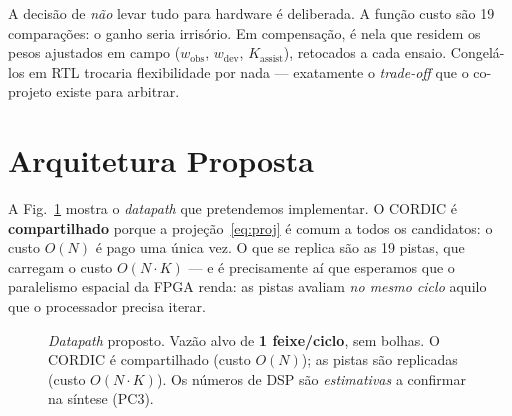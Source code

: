 \documentclass[conference]{IEEEtran}
\begin{document}
A decis\~ao de \emph{n\~ao} levar tudo para hardware \'e deliberada. A fun\c{c}\~ao
custo s\~ao \num{19} compara\c{c}\~oes: o ganho seria irris\'orio. Em compensa\c{c}\~ao,
\'e nela que residem os pesos ajustados em campo ($w_{\text{obs}}$,
$w_{\text{dev}}$, $K_{\text{assist}}$), retocados a cada ensaio. Congel\'a-los em
RTL trocaria flexibilidade por nada --- exatamente o \emph{trade-off} que o
co-projeto existe para arbitrar.

\section{Arquitetura Proposta}

A Fig.~\ref{fig:arq} mostra o \emph{datapath} que pretendemos implementar. O
CORDIC \'e \textbf{compartilhado} porque a proje\c{c}\~ao~\eqref{eq:proj} \'e
comum a todos os candidatos: o custo $O(N)$ \'e pago uma \'unica vez. O que se
replica s\~ao as \num{19} pistas, que carregam o custo $O(N\cdot K)$ --- e \'e
precisamente a\'i que esperamos que o paralelismo espacial da FPGA renda: as
pistas avaliam \emph{no mesmo ciclo} aquilo que o processador precisa iterar.

\begin{figure}[!t]
\centering
{}
\caption{\emph{Datapath} proposto. Vaz\~ao alvo de \textbf{1 feixe/ciclo}, sem
bolhas. O CORDIC \'e compartilhado (custo $O(N)$); as pistas s\~ao replicadas
(custo $O(N\cdot K)$). Os n\'umeros de DSP s\~ao \emph{estimativas} a confirmar na
s\'intese (PC3).}
\label{fig:arq}
\end{figure}
\end{document}
